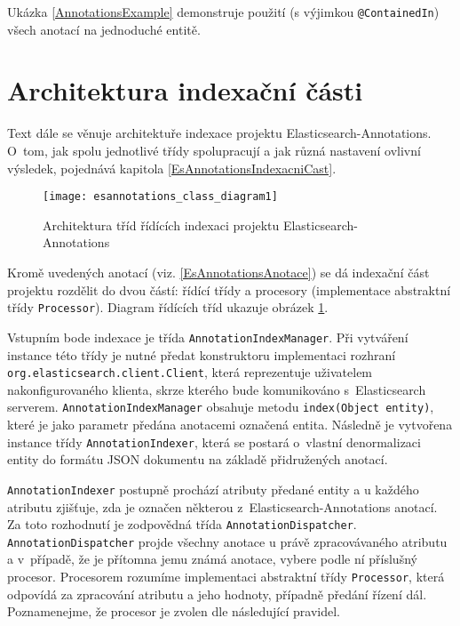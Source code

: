 \documentclass[11pt,oneside]{fithesis2}
\begin{document}
Ukázka \ref{AnnotationsExample} demonstruje použití (s výjimkou \texttt{@ContainedIn}) všech anotací na jednoduché entitě.

\section{Architektura indexační části}
Text dále se věnuje architektuře indexace projektu Elasticsearch-Annotations. O~tom, jak spolu jednotlivé třídy spolupracují a jak různá nastavení ovlivní výsledek, pojednává kapitola \ref{EsAnnotationsIndexacniCast}.

\begin{figure}[h]
	\begin{center}
		\texttt{[image: esannotations\_class\_diagram1]}
	\end{center}
	\caption{Architektura tříd řídících indexaci projektu Elasticsearch-Annotations}	
	\label{EsAnnotationsIndexaceArchitektura1}
\end{figure}

Kromě uvedených anotací (viz. \ref{EsAnnotationsAnotace}) se dá indexační část projektu rozdělit do dvou částí: řídící třídy a procesory (implementace abstraktní třídy \texttt{Processor}). Diagram řídících tříd ukazuje obrázek \ref{EsAnnotationsIndexaceArchitektura1}.

Vstupním bode indexace je třída \texttt{AnnotationIndexManager}. Při vytváření instance této třídy je nutné předat konstruktoru implementaci rozhraní \texttt{org.elasticsearch.client.Client}, která reprezentuje uživatelem nakonfigurovaného klienta, skrze kterého bude komunikováno s~Elasticsearch serverem. \texttt{AnnotationIndexManager} obsahuje metodu \texttt{index(Object entity)}, které je jako parametr předána anotacemi označená entita. Následně je vytvořena instance třídy \texttt{AnnotationIndexer}, která se postará o~vlastní denormalizaci entity do formátu JSON dokumentu na základě přidružených anotací.

\texttt{AnnotationIndexer} postupně prochází atributy předané entity a u každého atributu zjišťuje, zda je označen některou z~Elasticsearch-Annotations anotací. Za toto rozhodnutí je zodpovědná třída \texttt{AnnotationDispatcher}. \texttt{AnnotationDispatcher} projde všechny anotace u právě zpracovávaného atributu a v~případě, že je přítomna jemu známá anotace, vybere podle ní příslušný procesor. Procesorem rozumíme implementaci abstraktní třídy \texttt{Processor}, která odpovídá za  zpracování atributu a jeho hodnoty, případně předání řízení dál. Poznamenejme, že procesor je zvolen dle následující pravidel.
\end{document}
